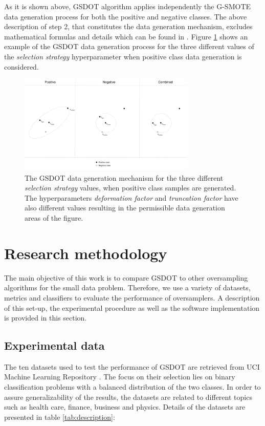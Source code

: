 As it is shown above, GSDOT algorithm applies independently the G-SMOTE data generation process for both the positive and negative classes. The above description of step 2, that constitutes the data generation mechanism,  excludes mathematical formulas and details which can be found in \cite{Douzas.2019}. Figure \ref{fig:gsmotemechanism} shows an example of the GSDOT data generation process for the three different values of the \textit{selection strategy} hyperparameter when positive class data generation is considered.

\begin{figure}
	\centering
	\includegraphics[width=0.75\textwidth]{../analysis/gsmote_mechanism.png}
	\caption{The GSDOT data generation mechanism for the three  different \textit{selection strategy} values, when positive class samples are generated. The hyperparameters \textit{deformation factor} and \textit{truncation factor} have also different values resulting in the permissible data generation areas of the figure.}
	\label{fig:gsmotemechanism}
\end{figure}

\section{Research methodology}
\label{research}

The main objective of this work is to compare GSDOT to other oversampling
algorithms for the small data problem. Therefore, we use a variety of datasets, metrics and classifiers to evaluate the performance of oversamplers. A description of this set-up, the experimental procedure as well as the software implementation is provided in this section.

\subsection{Experimental data}

The ten datasets used to test the performance of GSDOT are retrieved from UCI Machine Learning Repository \cite{Dua.2019}. The focus on their selection lies on binary classification problems with a balanced distribution of the two classes. In order to assure generalizability of the results, the datasets are related to different topics such as health care, finance, business and physics. Details of the datasets are presented in table \ref{tab:description}:

